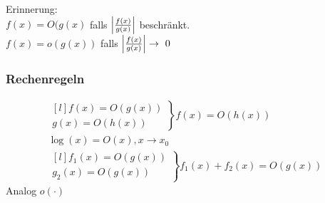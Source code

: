 Erinnerung:\\
$f(x) = O(g(x)$ falls $\abs{\frac{f(x)}{g(x)}}$ beschränkt.\\
$f(x) = o(g(x))$ falls $\abs{\frac{f(x)}{g(x)}} \rightarrow 0$\\

\subsubsection{Rechenregeln}
\begin{gather*}
	\left. \begin{matrix*}[l]
		f(x) = O(g(x))	\\
		g(x) = O(h(x))	
	\end{matrix*} \right\} f(x) = O(h(x)) \\
	\log(x) = O(x), x \rightarrow x_0 \\
	\left. \begin{matrix*}[l]
		f_1(x) = O(g(x))	\\
		g_2(x) = O(g(x))	
	\end{matrix*} \right\} f_1(x) + f_2(x) = O(g(x))
\end{gather*}
Analog $o( \cdot )$
